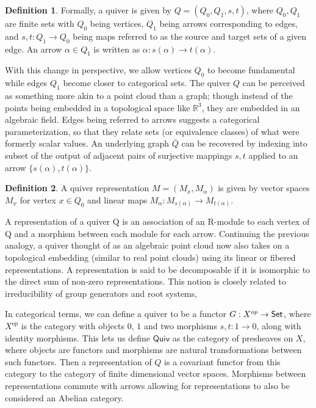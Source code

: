 \documentclass{article}
\theoremstyle{definition}
\newtheorem{definition}{Definition}[section]
\begin{document}
\begin{definition}
    Formally, a quiver is given by $Q=(Q_0, Q_1, s, t)$, where $Q_0,Q_1$ are finite sets with $Q_0$ being vertices, $Q_1$ being arrows corresponding to edges, and $s, t: Q_1 \to Q_0$ being maps referred to as the source and target sets of a given edge. An arrow $\alpha \in Q_1$ is written as $\alpha: s(\alpha) \to t(\alpha)$.
\end{definition}


With this change in perspective, we allow vertices $Q_0$ to become fundamental while edges $Q_1$ become closer to categorical sets. The quiver $Q$ can be perceived as something more akin to a point cloud than a graph; though instead of the points being embedded in a topological space like $\mathbb{R}^3$, they are embedded in an algebraic field. 
Edges being referred to arrows suggests a categorical parameterization, so that they relate sets (or equivalence classes) of what were formerly scalar values. 
An underlying graph $\bar{Q}$ can be recovered by indexing into subset of the output of adjacent pairs of surjective mappings $s, t$ applied to an arrow $\{s(\alpha), t(\alpha)\}$.


\begin{definition}
    A quiver representation $M=(M_x, M_\alpha)$ is given by vector spaces $M_x$ for vertex $x \in Q_0$ and linear maps $M_\alpha: M_{s(\alpha)} \to M_{t(\alpha)}$.
\end{definition}

A representation of a quiver Q is an association of an R-module to each vertex of Q and a morphism between each module for each arrow. Continuing the previous analogy, a quiver thought of as an algebraic point cloud now also takes on a topological embedding (similar to real point clouds) using its linear or fibered representations.  A representation is said to be decomposable if it is isomorphic to the direct sum of non-zero representations. This notion is closely related to irreducibility of group generators and root systems, 


In categorical terms, we can define a quiver to be a functor $G:X^{\normalfont{op}}\to \mathsf{Set}$, where $X^{op}$ is the category with objects $0$, $1$ and two morphisms $s,t:1 \to 0$, along with identity morphisms. This lets us define $\mathsf{Quiv}$ as the category of presheaves on $X$, where objects are functors and morphisms are natural transformations between such functors. Then a representation of $Q$ is a covariant functor from this category to the category of finite dimensional vector spaces. Morphisms between representations commute with arrows allowing for representations to also be considered an Abelian category.
\end{document}
